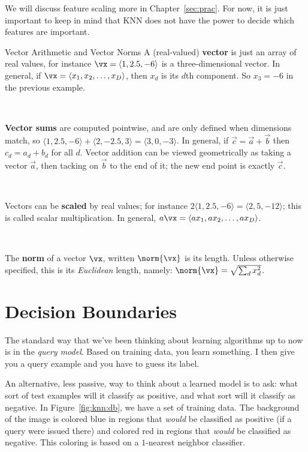 \MoveNextFigure{-5cm}


We will discuss feature scaling more in Chapter~\ref{sec:prac}.  For
now, it is just important to keep in mind that KNN does not have the
power to decide which features are important.

\begin{mathreview}{Vector Arithmetic and Vector Norms}
  A (real-valued) \textbf{vector} is just an array of real values, for
  instance $\vx = \langle 1, 2.5, -6 \rangle$ is a three-dimensional
  vector. In general, if $\vx = \langle x_1, x_2, \dots, x_D \rangle$,
  then $x_d$ is its $d$th component. So $x_3 = -6$ in the previous
  example.
  
~

  \textbf{Vector sums} are computed pointwise, and are only defined when
  dimensions match, so $\langle 1, 2.5, -6 \rangle + \langle 2, -2.5,
  3 \rangle = \langle 3, 0, -3 \rangle$. In general, if $\vec c = \vec
  a + \vec b$ then $c_d = a_d + b_d$ for all $d$. Vector addition can
  be viewed geometrically as taking a vector $\vec a$, then tacking on
  $\vec b$ to the end of it; the new end point is exactly $\vec c$.

~

  Vectors can be \textbf{scaled} by real values; for instance $2
  \langle 1, 2.5, -6 \rangle = \langle 2, 5, -12 \rangle$; this is
  called scalar multiplication. In general, $a \vx = \langle a x_1, a
  x_2, \dots, a x_D \rangle$.

~

  The \textbf{norm} of a vector $\vx$, written $\norm{\vx}$ is its
  length. Unless otherwise specified, this is its \emph{Euclidean}
  length, namely: $\norm{\vx} = \sqrt{\sum_d x_d^2}$.
\end{mathreview}

\section{Decision Boundaries}

The standard way that we've been thinking about learning algorithms up
to now is in the \emph{query model}.  Based on training data, you
learn something.  I then give you a query example and you have to
guess its label.


An alternative, less passive, way to think about a learned model is to
ask: what sort of test examples will it classify as positive, and what
sort will it classify as negative.  In Figure~\ref{fig:knn:db}, we have a
set of training data.  The background of the image is colored blue in
regions that \emph{would} be classified as positive (if a query were
issued there) and colored red in regions that \emph{would} be
classified as negative.  This coloring is based on a $1$-nearest
neighbor classifier.

